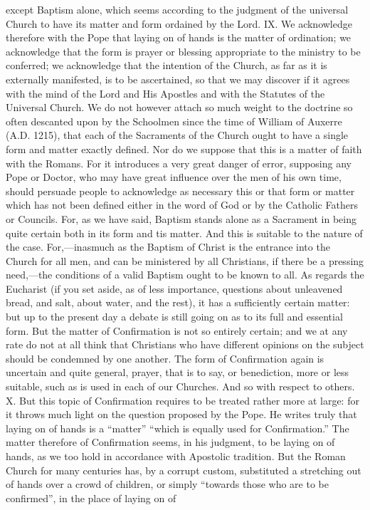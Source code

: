 except Baptism alone, which seems according to the judgment of the universal Church to have its matter and form ordained by the Lord. IX. We acknowledge therefore with the Pope that laying on of hands is the matter of ordination; we acknowledge that the form is prayer or blessing appropriate to the ministry to be conferred; we acknowledge that the intention of the Church, as far as it is externally manifested, is to be ascertained, so that we may discover if it agrees with the mind of the Lord and His Apostles and with the Statutes of the Universal Church. We do not however attach so much weight to the doctrine so often descanted upon by the Schoolmen since the time of William of Auxerre (A.D. 1215), that each of the Sacraments of the Church ought to have a single form and matter exactly defined. Nor do we suppose that this is a matter of faith with the Romans. For it introduces a very great danger of error, supposing any Pope or Doctor, who may have great influence over the men of his own time, should persuade people to acknowledge as necessary this or that form or matter which has not been defined either in the word of God or by the Catholic Fathers or Councils. For, as we have said, Baptism stands alone as a Sacrament in being quite certain both in its form and tis matter. And this is suitable to the nature of the case. For,—inasmuch as the Baptism of Christ is the entrance into the Church for all men, and can be ministered by all Christians, if there be a pressing need,—the conditions of a valid Baptism ought to be known to all. As regards the Eucharist (if you set aside, as of less importance, questions about unleavened bread, and salt, about water, and the rest), it has a sufficiently certain matter: but up to the present day a debate is still going on as to its full and essential form. But the matter of Confirmation is not so entirely certain; and we at any rate do not at all think that Christians who have different opinions on the subject should be condemned by one another. The form of Confirmation again is uncertain and quite general, prayer, that is to say, or benediction, more or less suitable, such as is used in each of our Churches. And so with respect to others. X. But this topic of Confirmation requires to be treated rather more at large: for it throws much light on the question proposed by the Pope. He writes truly that laying on of hands is a “matter” “which is equally used for Confirmation.” The matter therefore of Confirmation seems, in his judgment, to be laying on of hands, as we too hold in accordance with Apostolic tradition. But the Roman Church for many centuries has, by a corrupt custom, substituted a stretching out of hands over a crowd of children, or simply “towards those who are to be confirmed”, in the place of laying on of

